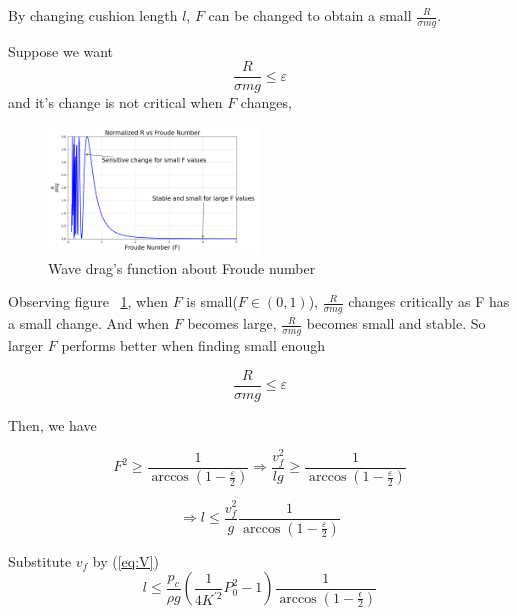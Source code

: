 By changing cushion length $l$, $F$ can be changed to obtain a small $\frac{R}{\sigma mg}$.

Suppose we want
\begin{equation}
\frac{R}{\sigma mg} \leq \varepsilon  
\end{equation}
and it's change is not critical when $F$ changes, 

\begin{figure}[H]
  \centering
  \includegraphics[width=0.5\textwidth]{images/R.png}
  \caption{Wave drag's function about Froude number}
  \label{fig:R}
\end{figure}

Observing figure ~\ref{fig:R}, when $F$ is small($F\in(0,1)$),  $\frac{R}{\sigma mg}$ changes critically as F has a small change. And when $F$ becomes large, $\frac{R}{\sigma mg}$ becomes small and stable. So larger $F$ performs better when finding small enough 

\begin{equation}
\frac{R}{\sigma mg} \leq \varepsilon 
\end{equation}

Then, we have

\begin{equation}
F^{2} \geq \frac{1}{\arccos\left(1 - \frac{\varepsilon}{2}\right)} \Rightarrow \frac{v_f^{2}}{lg} \geq \frac{1}{\arccos\left(1 - \frac{\varepsilon}{2}\right)}
\end{equation}

\begin{equation}
\Rightarrow l \leq \frac{v_f^{2}}{g} \frac{1}{\arccos\left(1 - \frac{\varepsilon}{2}\right)}
\end{equation}

Substitute $v_f$ by (\ref{eq:V})
\begin{equation}
 \boxed{l \leq \frac{p_{c}}{\rho g} \left( \frac{1}{4 K^{\prime 2}} P_{0}^{2} - 1 \right) \frac{1}{\arccos \left( 1 - \frac{\epsilon}{2} \right)} }
\end{equation}

